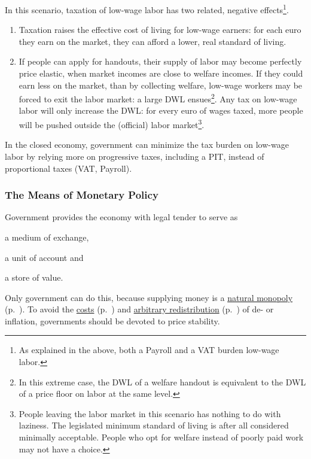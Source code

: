 In this scenario, taxation of low-wage labor has two related, negative effects\footnote{
	As explained in the above, both a \gls{Payroll} and a \gls{VAT} burden low-wage labor.}.
\begin{enumerate}
	\item Taxation raises the effective cost of living for low-wage earners: for each euro they earn on the market, they can afford a lower, real standard of living.
	\item If people can apply for handouts, their supply of labor may become perfectly price elastic, when market incomes are close to welfare incomes. If they could earn less on the market, than by collecting welfare, low-wage workers may be forced to exit the labor market: a large \gls{DWL} ensues\footnote{
		In this extreme case, the \gls{DWL} of a welfare handout is equivalent to the \gls{DWL} of a price floor on labor at the same level.}.
	Any tax on low-wage labor will only increase the \gls{DWL}: for every euro of wages taxed, more people will be pushed outside the (official) labor market\footnote{
		People leaving the labor market in this scenario has nothing to do with laziness. The legislated minimum standard of living is after all considered minimally acceptable. People who opt for welfare instead of poorly paid work may not have a choice.}.
\end{enumerate}

In the closed economy, government can minimize the tax burden on low-wage labor by relying more on progressive taxes, including a \gls{PIT}, instead of proportional taxes (\gls{VAT}, \gls{Payroll}).


\subsubsection[Monetary Policy]{The Means of Monetary Policy} \label{sec:monetary}
Government provides the economy with legal tender to serve as \begin{inparaenum}[1)]
	\item a medium of exchange,
	\item a unit of account and
	\item a store of value.
\end{inparaenum}
Only government can do this, because supplying money is a \hyperref[sec:natural-monopoly]{natural monopoly} (p.~\pageref{sec:natural-monopoly}). To avoid the \hyperref[sec:price-stability]{costs} (p.~\pageref{sec:price-stability}) and  \hyperref[sec:distributive-effects-of-inflation]{arbitrary redistribution} (p.~\pageref{sec:distributive-effects-of-inflation}) of de- or inflation,
governments should be devoted to price stability.

